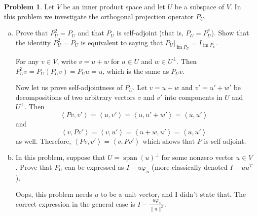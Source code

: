 \documentclass[11pt,oneside]{amsart}
\theoremstyle{definition}
\newtheorem{problem}{Problem}
\newcommand{\innerprod}[1]{\left\langle#1\right\rangle}
\DeclareMathOperator{\Span}{span}
\DeclareMathOperator{\im}{im}
\begin{document}
    \begin{problem}
        Let $V$ be an inner product space and let $U$ be a subspace of $V$. In this problem we investigate the orthogonal projection operator $P_U$.
        \begin{enumerate}[(a)]
            \item Prove that $P_U^2=P_U$ and that $P_U$ is self-adjoint (that is, $P_U=P_U^*$). Show that the identity $P_U^2=P_U$ is equivalent to saying that $P_U|_{\im P_U}=I_{\im P_U}$.
            \begin{solution}
                For any $v\in V$, write $v=u+w$ for $u\in U$ and $w\in U^\perp$. Then $P_U^2v=P_U(P_Uv)=P_Uu=u$, which is the same as $P_Uv$.

                Now let us prove self-adjointness of $P_U$. Let $v=u+w$ and $v'=u'+w'$ be decompositions of two arbitrary vectors $v$ and $v'$ into components in $U$ and $U^\perp$. Then
                \[\innerprod{Pv,v'}=\innerprod{u,v'}=\innerprod{u,u'+w'}=\innerprod{u,u'}\]
                and
                \[\innerprod{v,Pv'}=\innerprod{v,u'}=\innerprod{u+w,u'}=\innerprod{u,u'}\]
                as well. Therefore, $\innerprod{Pv,v'}=\innerprod{v,Pv'}$ which shows that $P$ is self-adjoint.
            \end{solution}
            \item In this problem, suppose that $U=\Span(u)^\perp$ for some nonzero vector $u\in V$. Prove that $P_U$ can be expressed as $I-u\varphi_u$ (more classically denoted $I-uu^T$).
            \begin{solution}
                Oops, this problem needs $u$ to be a unit vector, and I didn't state that. The correct expression in the general case is $I-\frac{u\varphi_u}{\|u\|^2}$.


\end{solution}
\end{enumerate}
\end{problem}
\end{document}
